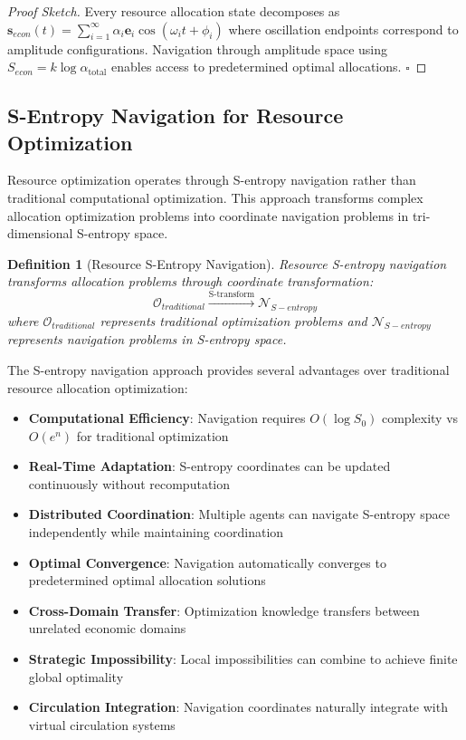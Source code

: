 \documentclass[12pt,a4paper]{article}
\newtheorem{definition}[theorem]{Definition}
\begin{document}
\begin{proof}[Proof Sketch]
Every resource allocation state decomposes as $\mathbf{s}_{econ}(t) = \sum_{i=1}^{\infty} \alpha_i \mathbf{e}_i \cos(\omega_i t + \phi_i)$ where oscillation endpoints correspond to amplitude configurations. Navigation through amplitude space using $S_{econ} = k \log \alpha_{\text{total}}$ enables access to predetermined optimal allocations. $\square$
\end{proof}

\subsection{S-Entropy Navigation for Resource Optimization}

Resource optimization operates through S-entropy navigation rather than traditional computational optimization. This approach transforms complex allocation optimization problems into coordinate navigation problems in tri-dimensional S-entropy space.

\begin{definition}[Resource S-Entropy Navigation]
Resource S-entropy navigation transforms allocation problems through coordinate transformation:
\begin{equation}
\mathcal{O}_{traditional} \xrightarrow{\text{S-transform}} \mathcal{N}_{S-entropy}
\end{equation}
where $\mathcal{O}_{traditional}$ represents traditional optimization problems and $\mathcal{N}_{S-entropy}$ represents navigation problems in S-entropy space.
\end{definition}

The S-entropy navigation approach provides several advantages over traditional resource allocation optimization:
\begin{itemize}
\item \textbf{Computational Efficiency}: Navigation requires $O(\log S_0)$ complexity vs $O(e^n)$ for traditional optimization
\item \textbf{Real-Time Adaptation}: S-entropy coordinates can be updated continuously without recomputation
\item \textbf{Distributed Coordination}: Multiple agents can navigate S-entropy space independently while maintaining coordination
\item \textbf{Optimal Convergence}: Navigation automatically converges to predetermined optimal allocation solutions
\item \textbf{Cross-Domain Transfer}: Optimization knowledge transfers between unrelated economic domains
\item \textbf{Strategic Impossibility}: Local impossibilities can combine to achieve finite global optimality
\item \textbf{Circulation Integration}: Navigation coordinates naturally integrate with virtual circulation systems
\end{itemize}
\end{document}
